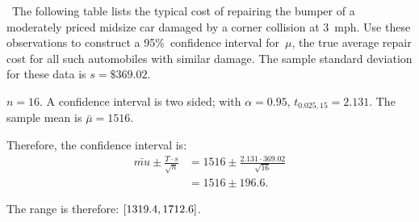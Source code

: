 \begin{problem}
  ~The following table lists the typical cost of repairing the bumper of a moderately priced midsize car damaged by a corner collision at 3~mph.  Use these observations to construct a 95\%~confidence interval for~$\mu$, the true average repair cost for all such automobiles with similar damage.  The sample standard deviation for these data is ${s = \$369.02}$.
\end{problem}

${n = 16}$. A confidence interval is two sided; with ${\alpha = 0.95}$, ${t_{0.025,15} = 2.131}$.  The sample mean is ${\bar{\mu} = 1516}$.

Therefore, the confidence interval is:
\begin{align}
  \bar{mu} \pm \frac{T \cdot s}{\sqrt{n}} &= 1516 \pm \frac{2.131 \cdot 369.02}{\sqrt{16}} \\
                                          &= 1516 \pm 196.6 \text{.}
\end{align}

The range is therefore: $\lbrack1319.4,1712.6\rbrack$.

